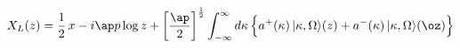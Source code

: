 \begin{equation}
X_L(z)=
\frac{1}{2}\,x-i\ap p\log z
+\left[\frac{\ap}{2}\right]^{\frac12}
\int_{-\infty}^{\infty}d\kappa\,
\Bigl\{a^+(\kappa)\,|\kappa,\Omega\rangle(z)+
a^-(\kappa)\,|\kappa,\Omega\rangle(\oz)\Bigr\}
\end{equation}

